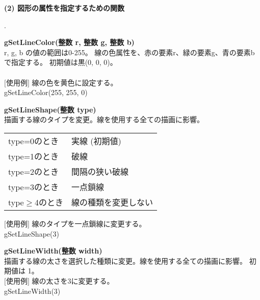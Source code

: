 \documentclass[11pt,a4j]{jarticle}
\newcounter{enum2}
\newenvironment{enumerate2}{%
   \begin{list}%
   {%
      \arabic{enum2}.\ \,%
   }%
   {%
      \usecounter{enum2}
      \setlength{\itemindent}{0zw}%
      \setlength{\leftmargin}{3zw}%
      \setlength{\rightmargin}{0zw}%
      \setlength{\labelsep}{0zw}%
      \setlength{\labelwidth}{3zw}%
      \setlength{\itemsep}{0em}%
      \setlength{\parsep}{0em}%
      \setlength{\listparindent}{0zw}%
   }
}{%
   \end{list}%
}
\begin{document}
{\large{
{\bf{
(2) 図形の属性を指定するための関数
}}
}}
\begin{enumerate2}
\item {\bf{gSetLineColor(整数 r, 整数 g, 整数 b)}} \\
   r, g, b の値の範囲は0-255。
       線の色属性を、赤の要素r、緑の要素g、青の要素bで指定する。
       初期値は黒(0, 0, 0)。\\
\ \\
	 \hspace{10pt}  $[$使用例$]$ 線の色を黄色に設定する。\\
         \hspace{55pt}     gSetLineColor(255, 255, 0) \\

\item {\bf{gSetLineShape(整数 type)}} \\
      描画する線のタイプを変更。線を使用する全ての描画に影響。

      \begin{table}[!h]
      \begin{center}
      {\small{
      \begin{tabular}{l l}
        type=0のとき & 実線 (初期値) \\
        type=1のとき & 破線 \\
        type=2のとき & 間隔の狭い破線 \\
        type=3のとき & 一点鎖線 \\
        type$\geq$4のとき & 線の種類を変更しない \\
      \end{tabular}
      }}
      \end{center}
      \end{table}
         \vspace{-5mm}
	 \hspace{10pt}  $[$使用例$]$  線のタイプを一点鎖線に変更する。 \\
         \hspace{55pt}     gSetLineShape(3) \\

\item {\bf{gSetLineWidth(整数 width)}} \\
      描画する線の太さを選択した種類に変更。線を使用する全ての描画に影響。
      初期値は 1。
\ \\
	 \hspace{10pt}  $[$使用例$]$  線の太さを3に変更する。 \\
         \hspace{55pt}     gSetLineWidth(3) \\


\end{enumerate2}
\end{document}
